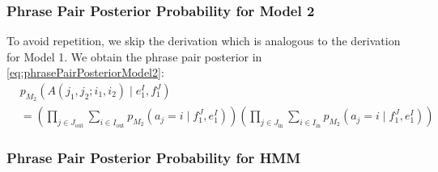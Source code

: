 \subsubsection{Phrase Pair Posterior Probability for Model 2}

To avoid repetition, we skip the derivation which is analogous to
the derivation for Model 1. We obtain the phrase pair posterior in
\autoref{eq:phrasePairPosteriorModel2}:
%
\begin{align}
  & p_{M_2}(A(j_1, j_2; i_1, i_2) \mid e_1^I, f_1^J) \nonumber \\
  &= \left( \prod_{j \in J_{\text{out}}} \sum_{i \in I_{\text{out}}} p_{M_2}(a_j = i \mid f_1^J, e_1^I) \right) \left( \prod_{j \in J_{\text{in}}} \sum_{i \in I_{\text{in}}} p_{M_2}(a_j = i \mid f_1^J, e_1^I) \right)
  \label{eq:phrasePairPosteriorModel2}
\end{align}
%

\subsubsection{Phrase Pair Posterior Probability for HMM}

